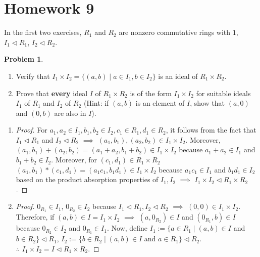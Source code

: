 \documentclass[11pt]{article}
\theoremstyle{definition}
\newtheorem{prob}[thm]{Problem}
\numberwithin{equation}{section}
\begin{document}
\section{Homework 9}

In the first two exercises, $R_{1}$ and $R_{2}$ are nonzero commutative rings with $1$, $I_{1} \vartriangleleft R_{1}$, $I_{2} \vartriangleleft R_{2}$.
\begin{prob}
\begin{enumerate}
    \item Verify that $I_{1} \times I_{2} = \{(a, b) \mid a \in I_{1}, b \in I_{2}\}$ is an ideal of $R_{1} \times R_{2}$.
    \item Prove that \textbf{every} ideal $I$ of $R_{1} \times R_{2}$ is of the form $I_{1} \times I_{2}$ for suitable ideals $I_{1}$ of $R_{1}$ and $I_{2}$ of $R_{2}$ (Hint: if $(a, b)$ is an element of $I$, show that $(a, 0)$ and $(0, b)$ are also in $I$).
\end{enumerate}
\end{prob}

\begin{enumerate}
    \item \begin{proof}For $a_{1}, a_{2} \in I_{1}, b_{1}, b_{2} \in I_{2}, c_{1} \in R_{1}, d_{1} \in R_{2}$, it follows from the fact that $I_{1} \vartriangleleft R_{1}$ and $I_{2} \vartriangleleft R_{2}$ $\implies$ $(a_{1}, b_{1}), (a_{2}, b_{2}) \in I_{1} \times I_{2}$. Moreover, $(a_{1}, b_{1}) + (a_{2}, b_{2}) = (a_{1}+a_{2}, b_{1}+b_{2}) \in I_{1} \times I_{2}$ because $a_{1}+a_{2} \in I_{1}$ and $b_{1}+b_{2} \in I_{2}$. Moreover, for $(c_{1}, d_{1}) \in R_{1} \times R_{2}$ $(a_{1}, b_{1})*(c_{1}, d_{1}) = (a_{1}c_{1}, b_{1}d_{1}) \in I_{1} \times I_{2}$ because $a_{1}c_{1} \in I_{1}$ and $b_{1}d_{1} \in I_{2}$ based on the product absorption properties of $I_{1}, I_{2}$ $\implies$ $I_{1} \times I_{2} \vartriangleleft R_{1} \times R_{2}$.
    \end{proof}
    \item \begin{proof}$0_{R_{1}} \in I_{1}$, $0_{R_{2}} \in I_{2}$ because $I_{1} \vartriangleleft R_{1}, I_{2} \vartriangleleft R_{2}$ $\implies$ $(0, 0) \in I_{1} \times I_{2}$. Therefore, if $(a,b) \in I = I_{1} \times I_{2}$ $\implies$ $(a,0_{R_{2}}) \in I$ and $(0_{R_{1}}, b) \in I$ because $0_{R_{2}} \in I_{2}$ and $0_{R_{1}} \in I_{1}$. Now, define $I_{1}:=\{a \in R_{1} \mid (a, b) \in I$ and $b \in R_{2}\} \vartriangleleft R_{1}$, $I_{2}:=\{b \in R_{2} \mid (a, b) \in I$ and $a \in R_{1}\} \vartriangleleft R_{2}$. \\
    $\therefore$ $I_{1} \times I_{2} = I \vartriangleleft R_{1} \times R_{2}$.
    \end{proof}
\end{enumerate}
\end{document}
